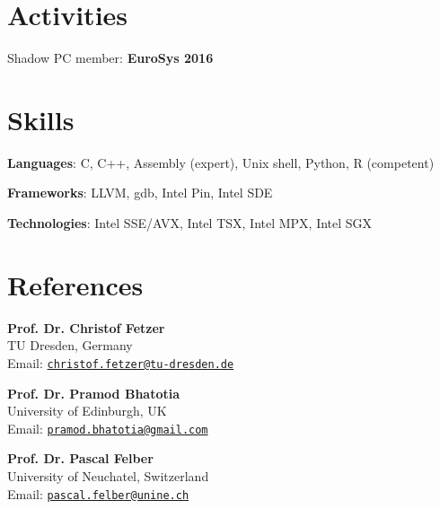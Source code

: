 \documentclass[letterpaper]{article}
\renewenvironment{itemize}{
  \begin{list}{}{
    \setlength{\leftmargin}{1.5em}
  }
}{
  \end{list}
}
\begin{document}
\section*{Activities}


\begin{itemize}
 \item { Shadow PC member:} {\bf EuroSys 2016}
\end{itemize}
  

\section*{Skills}
\begin{itemize}
	\item {\bf Languages}: C, C++, Assembly (expert), Unix shell, Python, R (competent)
	\item {\bf Frameworks}: LLVM, gdb, Intel Pin, Intel SDE
	\item {\bf Technologies}: Intel SSE/AVX, Intel TSX, Intel MPX, Intel SGX
\end{itemize}


\section*{References}

\begin{itemize}

\item {\bf Prof. Dr. Christof Fetzer }  \\
TU Dresden, Germany\\
Email: \href{mailto:christof.fetzer@tu-dresden.de}{\tt christof.fetzer@tu-dresden.de}
      
\item {\bf  Prof. Dr. Pramod Bhatotia }  \\
University of Edinburgh, UK\\
Email: \href{mailto:pramod.bhatotia@gmail.com}{\tt pramod.bhatotia@gmail.com}

\item {\bf Prof. Dr. Pascal Felber} \\
University of Neuchatel, Switzerland\\
Email: \href{mailto:pascal.felber@unine.ch}{\tt pascal.felber@unine.ch}

\end{itemize}
\end{document}

